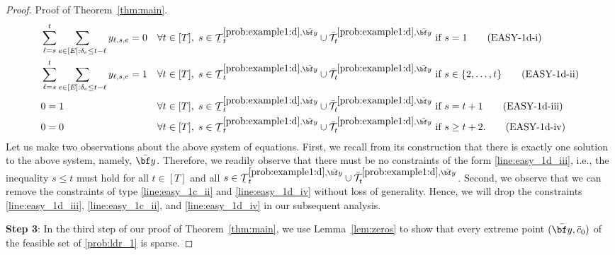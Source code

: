 \documentclass[nonblindrev,mnsc]{informs3} %
\newcommand{\by}{{\bf y}}
\newcommand{\ubar}[1]{\text{\b{$#1$}}}
\begin{document}
\begin{APPENDICES}
\begin{proof}{Proof of Theorem~\ref{thm:main}. }
\begin{align}
& \sum_{\ell=s}^t \sum_{e \in [E]: \delta_e \le t - \ell} y_{\ell,s,e}    = 0 && \forall t \in [T], \; s \in \ubar{\mathcal{T}}^{\ref{prob:example1:d},\bar{\by}}_t \cup \bar{\mathcal{T}}^{\ref{prob:example1:d},\bar{\by}}_t \text{ if } s =1\tag{EASY-1d-i} \label{line:easy_1d_i}\\
& \sum_{\ell=s}^t \sum_{e \in [E]: \delta_e \le t - \ell} y_{\ell,s,e}    = 1 && \forall t \in [T], \; s \in \ubar{\mathcal{T}}^{\ref{prob:example1:d},\bar{\by}}_t \cup \bar{\mathcal{T}}^{\ref{prob:example1:d},\bar{\by}}_t \text{ if } s \in \{2,\ldots,t\} \tag{EASY-1d-ii} \label{line:easy_1d_ii}\\
& 0   = 1 && \forall t \in [T], \; s \in \ubar{\mathcal{T}}^{\ref{prob:example1:d},\bar{\by}}_t \cup \bar{\mathcal{T}}^{\ref{prob:example1:d},\bar{\by}}_t \text{ if } s = t+1 \tag{EASY-1d-iii} \label{line:easy_1d_iii}\\
& 0   = 0 && \forall t \in [T], \; s \in \ubar{\mathcal{T}}^{\ref{prob:example1:d},\bar{\by}}_t \cup \bar{\mathcal{T}}^{\ref{prob:example1:d},\bar{\by}}_t \text{ if } s \ge t+2. \tag{EASY-1d-iv} \label{line:easy_1d_iv}
 \end{align}
Let us make two observations about the above system of equations. First, we recall from its construction that there is exactly one solution to the above system, namely, $\bar{\by}$. Therefore, we readily observe that there must be no constraints of the form \eqref{line:easy_1d_iii}, i.e.,  the inequality $s \le t$ must hold for all $t \in [T]$ and all $s \in \ubar{\mathcal{T}}^{\ref{prob:example1:d},\bar{\by}}_t \cup \bar{\mathcal{T}}^{\ref{prob:example1:d},\bar{\by}}_t$. Second, we observe that we can remove the constraints of type \eqref{line:easy_1c_ii} and \eqref{line:easy_1d_iv} without loss of generality. Hence, we will drop the constraints  \eqref{line:easy_1d_iii},  \eqref{line:easy_1c_ii}, and \eqref{line:easy_1d_iv}  in our subsequent analysis.  %
 \vspace{0.5em}
 
\textbf{Step 3}: In the third step of our proof of Theorem~\ref{thm:main}, we use Lemma~\ref{lem:zeros} to show that every extreme point $(\bar{\by},\bar{c}_0)$ of the feasible set of \eqref{prob:ldr_1} is sparse. 


\end{proof}
\end{APPENDICES}
\end{document}
